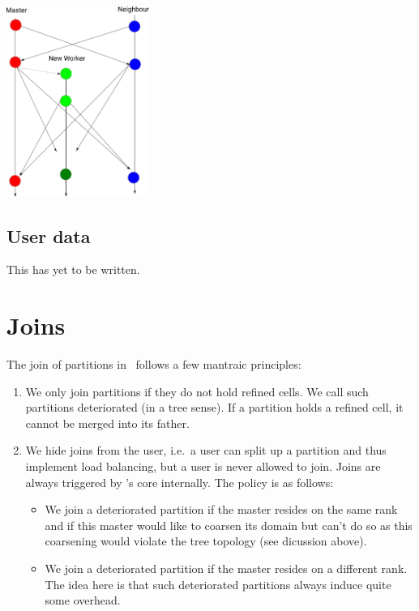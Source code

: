\begin{center}
 \includegraphics[width=0.35\textwidth]{51_domain-decomposition/split-data-flow.pdf}
\end{center}





\subsection{User data}

This has yet to be written.




\section{Joins}


The join of partitions in \Peano\ follows a few mantraic principles:

\begin{enumerate}
  \item We only join partitions if they do not hold refined cells. We call such
  partitions deteriorated (in a tree sense). If a partition holds a refined cell,
  it cannot be merged into its father.
  \item We hide joins from the user, i.e.~a user can split up a partition and
  thus implement load balancing, but a user is never allowed to join. Joins are
  always triggered by \Peano's core internally. The policy is as follows:
  \begin{itemize}
    \item We join a deteriorated partition if the master resides on the same rank
    and if this master would like to coarsen its domain but can't do so as this
    coarsening would violate the tree topology (see dicussion above).
    \item We join a deteriorated partition if the master resides on a different
    rank. The idea here is that such deteriorated partitions always induce quite
    some overhead.
  \end{itemize}
\end{enumerate}



